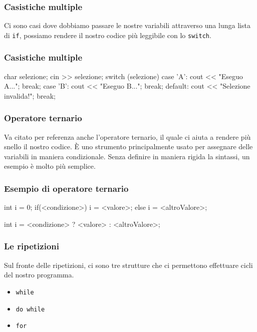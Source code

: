 \documentclass{beamer}
\begin{document}
    \begin{frame}
        \frametitle{Casistiche multiple}
        Ci sono casi dove dobbiamo passare le nostre variabili attraverso una lunga lista di \texttt{if}, possiamo rendere il nostro codice più leggibile con lo \texttt{switch}. 
    \end{frame}

    \begin{frame}[fragile]
        \frametitle{Casistiche multiple}
        \begin{cppcode}
            char selezione;
            cin >> selezione;
            switch (selezione)
            {
                case 'A':
                    cout << "Eseguo A...";
                    break;
                case 'B':
                    cout << "Eseguo B...";
                    break;
                default:
                    cout << "Selezione invalida!";
                    break;
            }
        \end{cppcode}
    \end{frame}

    \begin{frame}[fragile]
        \frametitle{Operatore ternario}
        Va citato per referenza anche l'operatore ternario, il quale ci aiuta a rendere più snello il nostro codice. È uno strumento principalmente usato per assegnare delle variabili in maniera condizionale. Senza definire in maniera rigida la sintassi, un esempio è molto più semplice.
    \end{frame}

    \begin{frame}[fragile]
        \frametitle{Esempio di operatore ternario}
        \begin{cppcode}
            int i = 0;
            if(<condizione>) {
                i = <valore>;
            } else {
                i = <altroValore>;
            }
        \end{cppcode}
        \begin{cppcode}
            int i = <condizione> ? <valore> : <altroValore>;
        \end{cppcode}
    \end{frame}

    \begin{frame}[fragile]
        \frametitle{Le ripetizioni}
        Sul fronte delle ripetizioni, ci sono tre strutture che ci permettono effettuare cicli del nostro programma.
        \begin{itemize}
            \item<2-> \texttt{while}
            \item<3-> \texttt{do while}
            \item<4-> \texttt{for}
        \end{itemize}
    \end{frame}
\end{document}
